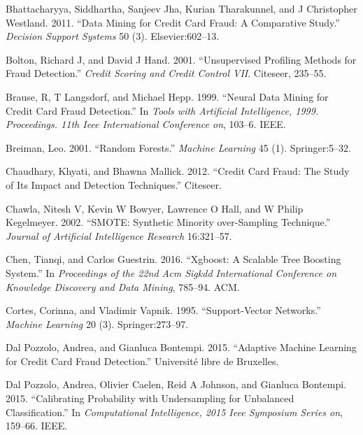 \documentclass[12pt,]{article}
\begin{document}
\leavevmode\hypertarget{ref-bhattacharyya2011data}{}%
Bhattacharyya, Siddhartha, Sanjeev Jha, Kurian Tharakunnel, and J
Christopher Westland. 2011. ``Data Mining for Credit Card Fraud: A
Comparative Study.'' \emph{Decision Support Systems} 50 (3).
Elsevier:602--13.

\leavevmode\hypertarget{ref-bolton2001unsupervised}{}%
Bolton, Richard J, and David J Hand. 2001. ``Unsupervised Profiling
Methods for Fraud Detection.'' \emph{Credit Scoring and Credit Control
VII}. Citeseer, 235--55.

\leavevmode\hypertarget{ref-brause1999neural}{}%
Brause, R, T Langsdorf, and Michael Hepp. 1999. ``Neural Data Mining for
Credit Card Fraud Detection.'' In \emph{Tools with Artificial
Intelligence, 1999. Proceedings. 11th Ieee International Conference on},
103--6. IEEE.

\leavevmode\hypertarget{ref-breiman2001random}{}%
Breiman, Leo. 2001. ``Random Forests.'' \emph{Machine Learning} 45 (1).
Springer:5--32.

\leavevmode\hypertarget{ref-chaudhary2012credit}{}%
Chaudhary, Khyati, and Bhawna Mallick. 2012. ``Credit Card Fraud: The
Study of Its Impact and Detection Techniques.'' Citeseer.

\leavevmode\hypertarget{ref-chawla2002smote}{}%
Chawla, Nitesh V, Kevin W Bowyer, Lawrence O Hall, and W Philip
Kegelmeyer. 2002. ``SMOTE: Synthetic Minority over-Sampling Technique.''
\emph{Journal of Artificial Intelligence Research} 16:321--57.

\leavevmode\hypertarget{ref-chen2016xgboost}{}%
Chen, Tianqi, and Carlos Guestrin. 2016. ``Xgboost: A Scalable Tree
Boosting System.'' In \emph{Proceedings of the 22nd Acm Sigkdd
International Conference on Knowledge Discovery and Data Mining},
785--94. ACM.

\leavevmode\hypertarget{ref-cortes1995support}{}%
Cortes, Corinna, and Vladimir Vapnik. 1995. ``Support-Vector Networks.''
\emph{Machine Learning} 20 (3). Springer:273--97.

\leavevmode\hypertarget{ref-dal2015adaptive}{}%
Dal Pozzolo, Andrea, and Gianluca Bontempi. 2015. ``Adaptive Machine
Learning for Credit Card Fraud Detection.'' Université libre de
Bruxelles.

\leavevmode\hypertarget{ref-dal2015calibrating}{}%
Dal Pozzolo, Andrea, Olivier Caelen, Reid A Johnson, and Gianluca
Bontempi. 2015. ``Calibrating Probability with Undersampling for
Unbalanced Classification.'' In \emph{Computational Intelligence, 2015
Ieee Symposium Series on}, 159--66. IEEE.
\end{document}

